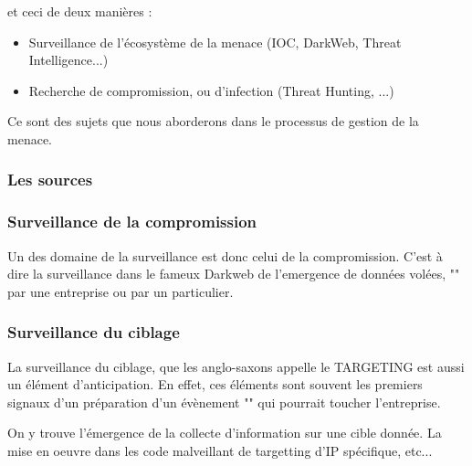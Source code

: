 et ceci de deux manières :

\begin{itemize}
  \item Surveillance de l'écosystème de la menace (IOC,  DarkWeb, Threat Intelligence...) 
  \item Recherche de compromission, ou d'infection (Threat Hunting, ...) 
\end{itemize}

Ce sont des sujets que nous aborderons dans le processus de gestion de la menace.

\begin{frame}
\frametitle<presentation>{Les sources}
\end{frame}




\subsubsection{Surveillance de la compromission}

Un des domaine de la surveillance est donc celui de la compromission. C'est à dire la surveillance dans le fameux Darkweb de l'emergence de données volées, "" par une entreprise ou par un particulier.


\subsubsection{Surveillance du ciblage}


La surveillance du ciblage, que les anglo-saxons appelle le TARGETING est aussi un élément d'anticipation. 
En effet, ces éléments sont souvent les premiers signaux d'un préparation d'un évènement "" qui pourrait toucher l'entreprise.

On y trouve l'émergence de la collecte d'information sur une cible donnée. La mise en oeuvre dans les code malveillant de targetting d'IP spécifique, etc...

